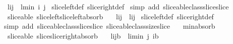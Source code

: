 \begin{isabellebody}
\ \ {\isachardoublequoteopen}{\isacharparenleft}l{\isasymdagger}{\isachardot}{\isachardot}i{\isacharparenright}{\isasymdagger}{\isachardot}{\isachardot}j\ {\isacharequal}\ {\isacharparenleft}l{\isasymdagger}{\isachardot}{\isachardot}{\isacharparenleft}min\ i\ j{\isacharparenright}{\isacharparenright}{\isachardoublequoteclose}\isanewline
%
\isadelimproof
%
\endisadelimproof
%
\isatagproof
{}\isamarkupfalse%
\ slice{\isacharunderscore}left{\isacharunderscore}def\ slice{\isacharunderscore}right{\isacharunderscore}def\isanewline
{}\isamarkupfalse%
\ {\isacharparenleft}simp\ add{\isacharcolon}\ sliceable{\isacharunderscore}class{\isachardot}slice{\isacharunderscore}slice{\isacharparenright}%
\endisatagproof
{\isafoldproof}%
%
\isadelimproof
\isanewline
%
\endisadelimproof
\isanewline
{}\isamarkupfalse%
\ {\isacharparenleft}\ sliceable{\isacharparenright}\ slice{\isacharunderscore}left{\isacharunderscore}slice{\isacharunderscore}left{\isacharunderscore}absorb{\isacharcolon}\ \isanewline
\ \ {\isachardoublequoteopen}{\isacharparenleft}l{\isasymdagger}i{\isachardot}{\isachardot}{\isacharparenright}{\isasymdagger}j{\isachardot}{\isachardot}\ {\isacharequal}\ l{\isasymdagger}{\isacharparenleft}i{\isacharplus}j{\isacharparenright}{\isachardot}{\isachardot}{\isachardoublequoteclose}\isanewline
%
\isadelimproof
%
\endisadelimproof
%
\isatagproof
{}\isamarkupfalse%
\ slice{\isacharunderscore}left{\isacharunderscore}def\ slice{\isacharunderscore}right{\isacharunderscore}def\isanewline
{}\isamarkupfalse%
\ {\isacharparenleft}simp\ add{\isacharcolon}\ sliceable{\isacharunderscore}class{\isachardot}slice{\isacharunderscore}slice\ sliceable{\isacharunderscore}class{\isachardot}size{\isacharunderscore}slice\ \isanewline
\ \ min{\isacharunderscore}absorb{}{\isacharparenright}%
\endisatagproof
{\isafoldproof}%
%
\isadelimproof
\isanewline
%
\endisadelimproof
\isanewline
{}\isamarkupfalse%
\ {\isacharparenleft}\ sliceable{\isacharparenright}\ slice{\isacharunderscore}slice{\isacharunderscore}right{\isacharunderscore}absorb{\isacharcolon}\ \isanewline
\ \ {\isachardoublequoteopen}{\isacharparenleft}l{\isasymdagger}i{\isachardot}{\isachardot}j{\isacharparenright}{\isasymdagger}{\isachardot}{\isachardot}b\ {\isacharequal}\ l{\isasymdagger}i{\isachardot}{\isachardot}{\isacharparenleft}min\ j\ {\isacharparenleft}i{\isacharplus}b{\isacharparenright}{\isacharparenright}{\isachardoublequoteclose}\isanewline
%
\isadelimproof
%
\endisadelimproof

\end{isabellebody}
